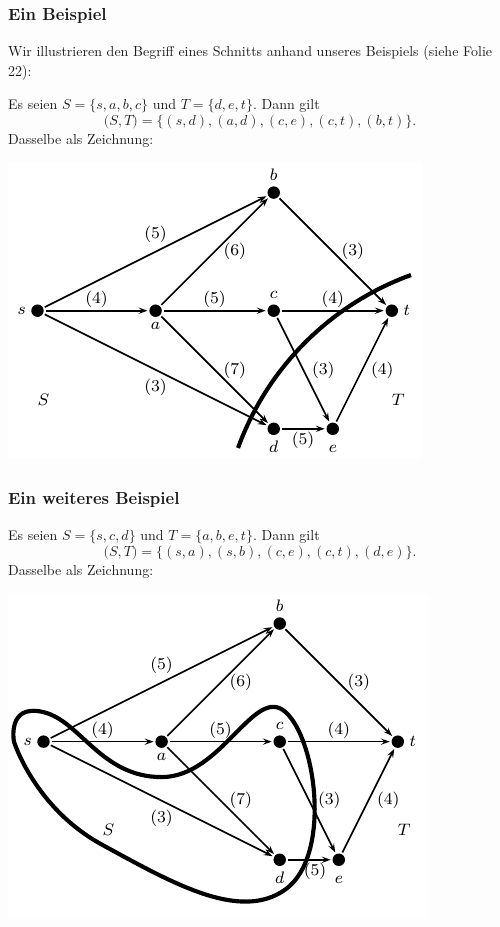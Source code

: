 \documentclass[smaller]{beamer}
\begin{document}
\begin{frame}
 \frametitle{Ein Beispiel}
 Wir illustrieren den Begriff eines Schnitts anhand unseres Beispiels (siehe Folie 22): \\ \vspace*{0.2cm}

 Es seien $S = \big\{ s,a,b,c \big\}$ und $T = \big\{ d,e,t \big\}$. Dann gilt 
\[
\big(S,T\big) = \big\{ (s,d), (a,d), (c,e), (c,t), (b,t) \big\}.
\]
Dasselbe als Zeichnung:
\begin{center}
 \includegraphics{fig11.pdf}
\end{center}
\end{frame}

\begin{frame}
 \frametitle{Ein weiteres Beispiel}
 Es seien $S = \big\{ s,c,d \big\}$ und $T = \big\{ a,b,e,t \big\}$. Dann gilt 
\[
\big(S,T\big) = \big\{ (s,a),(s,b), (c,e), (c,t), (d,e) \big\}.
\]
Dasselbe als Zeichnung:
\begin{center}
 \includegraphics{fig12.pdf}
\end{center}
\end{frame}
\end{document}
